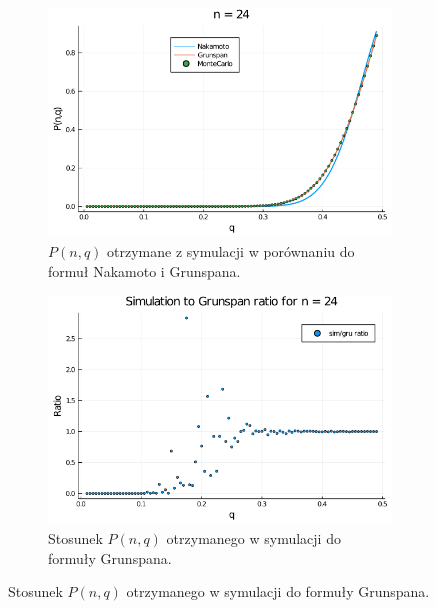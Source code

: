 \documentclass{article}
\begin{document}
        \begin{figure}[H]
            \centering
            \begin{subfigure}{0.65\textwidth}
                \includegraphics[width=\linewidth]{img/mc_n=24.png}
                \caption{$P(n,q)$ otrzymane z symulacji w porównaniu do formuł Nakamoto i Grunspana.}
            \end{subfigure}
    
            \begin{subfigure}{0.65\textwidth}
                \includegraphics[width=\linewidth]{img/mc_to_gr_n=24.png}
                \caption{Stosunek $P(n,q)$ otrzymanego w symulacji do formuły Grunspana.}
            \end{subfigure}
    

\end{figure}
\end{document}

